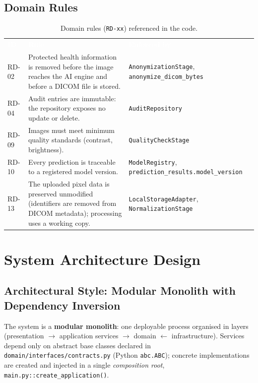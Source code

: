 \documentclass[12pt,a4paper]{article}
\newcommand{\fp}[1]{\nolinkurl{#1}}
\newcommand{\hd}[1]{\textcolor{white}{\textbf{#1}}}
\begin{document}
\subsection{Domain Rules}

\begin{table}[H]
\centering
\caption{Domain rules (\texttt{RD-xx}) referenced in the code.}
\label{tab:rd}
\renewcommand{\arraystretch}{1.3}
\begin{tabularx}{\textwidth}{C{1.3cm} Y L{4.6cm}}
\hd{ID} & \hd{Rule} & \hd{Enforced by} \\
RD-02 & Protected health information is removed before the image reaches the AI engine and before a DICOM file is stored. & \fp{AnonymizationStage}, \fp{anonymize_dicom_bytes} \\
RD-04 & Audit entries are immutable: the repository exposes no update or delete. & \texttt{AuditRepository} \\
RD-09 & Images must meet minimum quality standards (contrast, brightness). & \texttt{QualityCheckStage} \\
RD-10 & Every prediction is traceable to a registered model version. & \texttt{ModelRegistry}, \fp{prediction_results.model_version} \\
RD-13 & The uploaded pixel data is preserved unmodified (identifiers are removed from DICOM metadata); processing uses a working copy. & \fp{LocalStorageAdapter}, \fp{NormalizationStage} \\
\end{tabularx}
\end{table}

\section{System Architecture Design}
\label{sec:arch}

\subsection{Architectural Style: Modular Monolith with Dependency Inversion}

The system is a \textbf{modular monolith}: one deployable process organised in layers
(presentation $\to$ application services $\to$ domain $\leftarrow$ infrastructure). Services depend only
on abstract base classes declared in \fp{domain/interfaces/contracts.py} (Python \texttt{abc.ABC});
concrete implementations are created and injected in a single \emph{composition root},
\fp{main.py::create_application()}.
\end{document}
